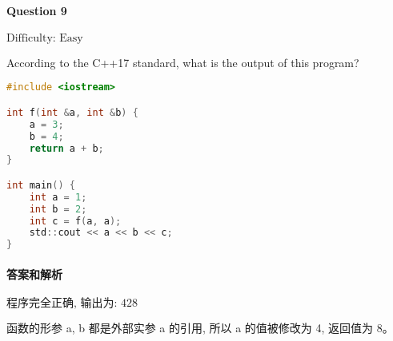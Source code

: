 \documentclass{article}
\begin{document}
	\paragraph*{Question 9} $\boxed{\text{Difficulty: Easy}} $			
	
	According to the C++17 standard, what is the output of this program?
	
	\begin{lstlisting}[language=C]  		
#include <iostream>

int f(int &a, int &b) {
	a = 3;
	b = 4;
	return a + b;
}

int main() {
	int a = 1;
	int b = 2;
	int c = f(a, a);
	std::cout << a << b << c;
}

	\end{lstlisting}
	
	
	\paragraph*{答案和解析} $\boxed{\text{程序完全正确, 输出为: 428}} $
	
	函数的形参 a, b 都是外部实参 a 的引用, 所以 a 的值被修改为 4, 返回值为 8。
\end{document}
